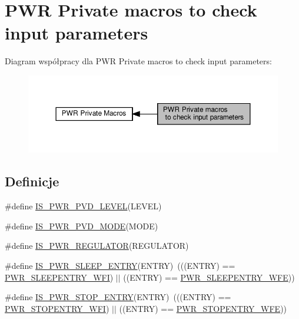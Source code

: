 \hypertarget{group___p_w_r___i_s___p_w_r___definitions}{}\section{P\+WR Private macros to check input parameters}
\label{group___p_w_r___i_s___p_w_r___definitions}
Diagram współpracy dla P\+WR Private macros to check input parameters\+:\nopagebreak
\begin{figure}[H]
\begin{center}
\leavevmode
\includegraphics[width=350pt]{group___p_w_r___i_s___p_w_r___definitions}
\end{center}
\end{figure}
\subsection*{Definicje}
\begin{DoxyCompactItemize}
\item 
\#define \hyperlink{group___p_w_r___i_s___p_w_r___definitions_gabac4485a57abc97aad91eaa0b65ae927}{I\+S\+\_\+\+P\+W\+R\+\_\+\+P\+V\+D\+\_\+\+L\+E\+V\+EL}(L\+E\+V\+EL)
\item 
\#define \hyperlink{group___p_w_r___i_s___p_w_r___definitions_ga8edfbbba20e58a9281408c23dc6ff7ef}{I\+S\+\_\+\+P\+W\+R\+\_\+\+P\+V\+D\+\_\+\+M\+O\+DE}(M\+O\+DE)
\item 
\#define \hyperlink{group___p_w_r___i_s___p_w_r___definitions_ga03c105070272141c0bab5f2b74469072}{I\+S\+\_\+\+P\+W\+R\+\_\+\+R\+E\+G\+U\+L\+A\+T\+OR}(R\+E\+G\+U\+L\+A\+T\+OR)
\item 
\#define \hyperlink{group___p_w_r___i_s___p_w_r___definitions_ga9b36a9c213a77d36340788b2e7e277ff}{I\+S\+\_\+\+P\+W\+R\+\_\+\+S\+L\+E\+E\+P\+\_\+\+E\+N\+T\+RY}(E\+N\+T\+RY)~(((E\+N\+T\+RY) == \hyperlink{group___p_w_r___s_l_e_e_p__mode__entry_ga4f0f99a3526c57efb3501b016639fa45}{P\+W\+R\+\_\+\+S\+L\+E\+E\+P\+E\+N\+T\+R\+Y\+\_\+\+W\+FI}) $\vert$$\vert$ ((E\+N\+T\+RY) == \hyperlink{group___p_w_r___s_l_e_e_p__mode__entry_ga2ef4bd42ad37dcfcd0813676087d559e}{P\+W\+R\+\_\+\+S\+L\+E\+E\+P\+E\+N\+T\+R\+Y\+\_\+\+W\+FE}))
\item 
\#define \hyperlink{group___p_w_r___i_s___p_w_r___definitions_ga4a94eb1f400dec6e486fbc229cbea8a0}{I\+S\+\_\+\+P\+W\+R\+\_\+\+S\+T\+O\+P\+\_\+\+E\+N\+T\+RY}(E\+N\+T\+RY)~(((E\+N\+T\+RY) == \hyperlink{group___p_w_r___s_t_o_p__mode__entry_ga3bdb1a9c9b421b73ab148d45eb90fa9b}{P\+W\+R\+\_\+\+S\+T\+O\+P\+E\+N\+T\+R\+Y\+\_\+\+W\+FI}) $\vert$$\vert$ ((E\+N\+T\+RY) == \hyperlink{group___p_w_r___s_t_o_p__mode__entry_ga2e1ee5c9577cc322474a826fa97de798}{P\+W\+R\+\_\+\+S\+T\+O\+P\+E\+N\+T\+R\+Y\+\_\+\+W\+FE}))
\end{DoxyCompactItemize}


